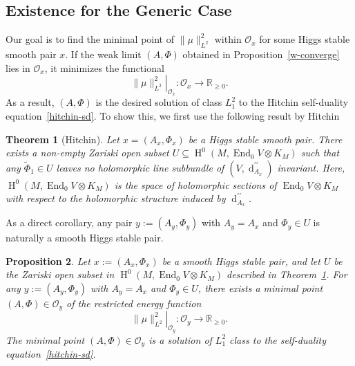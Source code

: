 \documentclass[a4paper]{amsart}
\newtheorem{theorem}{Theorem}[section]
\newtheorem{prop}[theorem]{Proposition}
\theoremstyle{definition}
\theoremstyle{remark}
\numberwithin{equation}{section}
\begin{document}
\subsection{Existence for the Generic Case}

Our goal is to find the minimal point of $\|\mu\|_{L^2}^2$ within $\mathcal{O}_x$ for some Higgs stable smooth pair $x$. If the weak limit $(A, \Phi)$ obtained in Proposition~\ref{w-converge} lies in $\mathcal{O}_x$, it minimizes the functional  
\[
\left.\|\mu\|_{L^2}^2\right|_{\mathcal{O}_x}: \mathcal{O}_x \to \mathbb{R}_{\geq0}.
\]  
As a result, $(A, \Phi)$ is the desired solution of class $L_1^2$ to the Hitchin self-duality equation~\eqref{hitchin-sd}. To show this, we first use the following result by Hitchin~\cite[Theorem~3.4]{hitchin1987self}  

\begin{theorem}[Hitchin]\label{irr}
Let $x = (A_x, \Phi_x)$ be a Higgs stable smooth pair. There exists a non-empty Zariski open subset $U \subseteq \operatorname{H}^0(M, \operatorname{End}_0 V \otimes K_M)$ such that any $\tilde{\Phi}_1 \in U$ leaves no holomorphic line subbundle of $(V, \operatorname{d}_{A_x}^{\prime\prime})$ invariant. 
Here, $\operatorname{H}^{0}(M, \operatorname{End}_0 V\otimes K_M)$ is the space of holomorphic sections of $\operatorname{End}_0 V \otimes K_M$ with respect to the holomorphic structure induced by $\operatorname{d}_{A_x}^{\prime\prime}$.
\end{theorem}

As a direct corollary, any pair $y := (A_y, \Phi_y)$ with $A_y = A_x$ and $\Phi_y \in U$ is naturally a smooth Higgs stable pair.

\begin{prop}\label{generic-case}
Let $x := (A_x, \Phi_x)$ be a smooth Higgs stable pair, and let $U$ be the Zariski open subset in $\operatorname{H}^{0}(M, \operatorname{End}_0 V\otimes K_M)$ described in Theorem~\ref{irr}. For any $y := (A_y, \Phi_y)$ with $A_y = A_x$ and $\Phi_y \in U$, there exists a minimal point $(A, \Phi) \in \mathcal{O}_y$ of the restricted energy function
\[
\left.\|\mu\|_{L^2}^2\right|_{\mathcal{O}_y} \colon \mathcal{O}_y \to \mathbb{R}_{\geq 0}.
\]
The minimal point $(A, \Phi) \in \mathcal{O}_y$ is a solution of $L_1^2$ class to the self-duality equation~\eqref{hitchin-sd}.
\end{prop}
\end{document}
